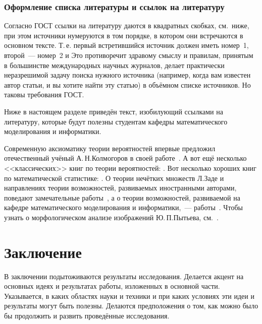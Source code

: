\documentclass[a4paper, 14pt, reqno, oneside]{extbook}
\begin{document}
\section{Оформление списка литературы и ссылок на литературу}

Согласно ГОСТ ссылки на литературу даются в квадратных скобках, см.~ниже, при этом источники нумеруются в том порядке, в котором они встречаются в основном тексте. Т.\,е. первый встретившийся источник должен иметь номер~1, второй~--- номер~2 и \td Это противоречит здравому смыслу и правилам, принятым в большинстве международных научных журналов, \tk делает практически неразрешимой задачу поиска нужного источника (например, когда вам известен автор статьи, и вы хотите найти эту статью) в объёмном списке источников. Но таковы требования ГОСТ.

Ниже в настоящем разделе приведён текст, изобилующий ссылками на литературу, которые будут полезны студентам кафедры математического моделирования и информатики.

Современную аксиоматику теории вероятностей впервые предложил отечественный учёный А.\,Н.\;Колмогоров в своей работе~\cite{cit:kolmogorov}. А вот ещё несколько <<классических>> книг по теории вероятностей: \cite{cit:feller, cit:neveu, cit:shir, cit:probbook-2010}. Вот несколько хороших книг по математической статистике: \cite{cit:leman, cit:barra, cit:borovkov-1997}. О теории нечётких множеств Л.\;Заде и направлениях теории возможностей, развиваемых иностранными авторами, поведают замечательные работы~\cite{cit:Zadeh-1978, cit:dubois_prade-1990}, а о теории возможностей, развиваемой на кафедре математического  моделирования и информатики,~--- работы~\cite{cit:possbook-2000, cit:possbook-2007}. Чтобы узнать о морфологическом анализе изображений Ю.\,П.\;Пытьева, см.~\cite{cit:PytyevMorphI, cit:PytyevMorphII, cit:PytyevMorphIII, cit:morph_book, cit:VizilterTh, cit:vizilter_lectures}.

\part*{Заключение}

В заключении подытоживаются результаты исследования. Делается акцент на основных идеях и результатах работы, изложенных в основной части. Указывается, в каких областях науки и техники и при каких условиях эти идеи и результаты могут быть полезны. Делаются предположения о том, как можно было бы продолжить и развить проведённые исследования.
\end{document}
